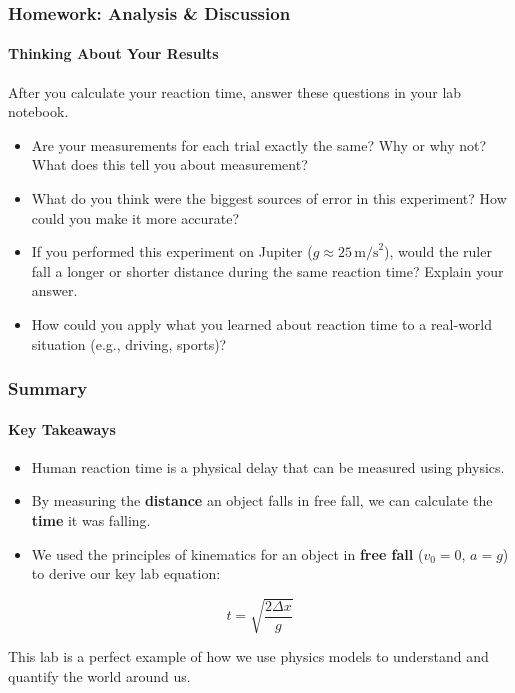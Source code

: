 \documentclass{beamer}
\begin{document}
\begin{frame}
\frametitle{Homework: Analysis \& Discussion}
\framesubtitle{Thinking About Your Results}
    After you calculate your reaction time, answer these questions in your lab notebook.
    \begin{itemize}
        \item Are your measurements for each trial exactly the same? Why or why not? What does this tell you about measurement?
        \item What do you think were the biggest sources of error in this experiment? How could you make it more accurate?
        \item If you performed this experiment on Jupiter ($g \approx 25 \, \text{m/s}^2$), would the ruler fall a longer or shorter distance during the same reaction time? Explain your answer.
        \item How could you apply what you learned about reaction time to a real-world situation (e.g., driving, sports)?
    \end{itemize}
\end{frame}

\begin{frame}
\frametitle{Summary}
\framesubtitle{Key Takeaways}
    \begin{itemize}
        \item Human reaction time is a physical delay that can be measured using physics. \pause
        \item By measuring the \textbf{distance} an object falls in free fall, we can calculate the \textbf{time} it was falling. \pause
        \item We used the principles of kinematics for an object in \textbf{free fall} ($v_0 = 0$, $a=g$) to derive our key lab equation:
    \end{itemize}
    \begin{center}
    \begin{block}{}
        \[ t = \sqrt{\frac{2 \Delta x}{g}} \]
    \end{block}
    \end{center}
    \vfill
    \begin{alertblock}{}
        This lab is a perfect example of how we use physics models to understand and quantify the world around us.
    \end{alertblock}
\end{frame}
\end{document}
